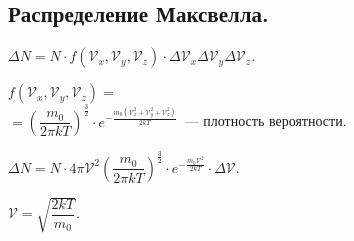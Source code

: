 \documentclass[12pt]{article}
\begin{document}
	\subsection{Распределение Максвелла.}
	\begin{definition}
		$\varDelta N = N \cdot f(\mathcal{V}_x, \mathcal{V}_y, \mathcal{V}_z) \cdot \varDelta \mathcal{V}_x \varDelta \mathcal{V}_y \varDelta \mathcal{V}_z$.
	\end{definition}
	\begin{definition}
		$f(\mathcal{V}_x, \mathcal{V}_y, \mathcal{V}_z) =$ \\
		$= \left( \dfrac{m_0}{2 \pi kT} \right)^{\frac{3}{2}} \cdot e^{- \frac{m_0(\mathcal{V}_x^2 + \mathcal{V}_y^2 + \mathcal{V}_z^2)}{2kT}}$~--- плотность вероятности.
	\end{definition}
	\begin{definition}
		$\varDelta N = N \cdot 4 \pi \mathcal{V}^2 \left( \dfrac{m_0}{2 \pi kT} \right)^{\frac{3}{2}} \cdot e^{- \frac{m_0\mathcal{V}^2}{2kT}} \cdot \varDelta \mathcal{V}$.
	\end{definition}
	\begin{definition}
		$\mathcal{V} = \sqrt{\dfrac{2kT}{m_0}}$.
	\end{definition}
\end{document}
